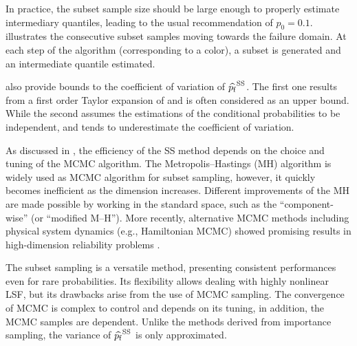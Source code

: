 
In practice, the subset sample size should be large enough to properly estimate intermediary quantiles, leading to the usual recommendation of $p_0=0.1$. 
 illustrates the consecutive subset samples moving towards the failure domain. 
At each step of the algorithm (corresponding to a color), a subset is generated and an intermediate quantile estimated.   

\cite{AuBeck2001} also provide bounds to the coefficient of variation of $\widehat{p_\mathrm{f}}^{\mathrm{SS}}$. 
The first one results from a first order Taylor expansion of  and is often considered as an upper bound. 
While the second assumes the estimations of the conditional probabilities to be independent, and tends to underestimate the coefficient of variation. 

As discussed in \citep{Papaioannou_PEM_2015}, the efficiency of the SS method depends on the choice and tuning of the MCMC algorithm. 
The Metropolis–Hastings (MH) algorithm is widely used as MCMC algorithm for subset sampling, however, it quickly becomes inefficient as the dimension increases.  
Different improvements of the MH are made possible by working in the standard space, such as the ``component-wise'' (or ``modified M–H''). 
More recently, alternative MCMC methods including physical system dynamics (e.g., Hamiltonian MCMC) showed promising results in high-dimension reliability problems \citep{papakonstantinou_2023_HMCMC}. 

The subset sampling is a versatile method, presenting consistent performances even for rare probabilities. 
Its flexibility allows dealing with highly nonlinear LSF, but its drawbacks arise from the use of MCMC sampling. 
The convergence of MCMC is complex to control and depends on its tuning, in addition, the MCMC samples are dependent. 
Unlike the methods derived from importance sampling, the variance of $\widehat{p_\mathrm{f}}^{\mathrm{SS}}$ is only approximated. 


